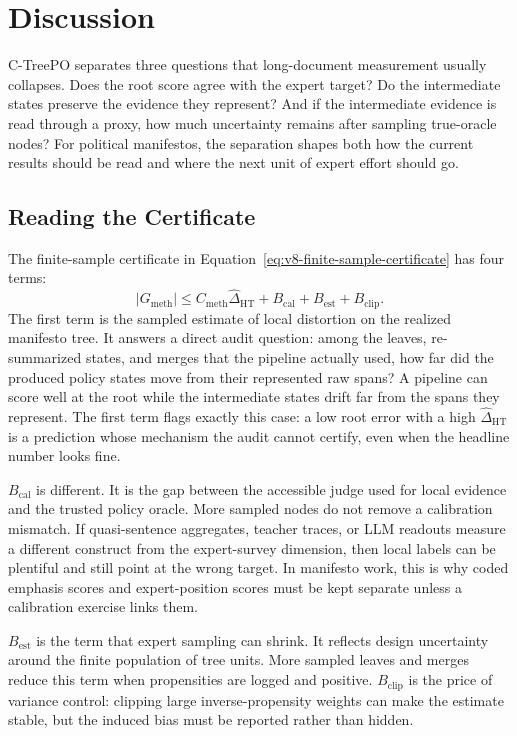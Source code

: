 \section{Discussion}\label{sec:v8-discussion}

C-TreePO separates three questions that long-document measurement
usually collapses. Does the root score agree with the expert target?
Do the intermediate states preserve the evidence they represent? And
if the intermediate evidence is read through a proxy, how much
uncertainty remains after sampling true-oracle nodes? For political
manifestos, the separation shapes both how the current results
should be read and where the next unit of expert effort should go.

\subsection{Reading the Certificate}

The finite-sample certificate in
Equation~\eqref{eq:v8-finite-sample-certificate} has four terms:
\[
  |G_{\mathrm{meth}}|
  \le
  C_{\mathrm{meth}}\widehat{\Delta}_{\mathrm{HT}}
  +
  B_{\mathrm{cal}}
  +
  B_{\mathrm{est}}
  +
  B_{\mathrm{clip}} .
\]
The first term is the sampled estimate of local distortion on the
realized manifesto tree. It answers a direct audit question: among
the leaves, re-summarized states, and merges that the pipeline
actually used, how far did the produced policy states move from
their represented raw spans? A pipeline can score well at the root
while the intermediate states drift far from the spans they
represent. The first term flags exactly this case: a low root error
with a high \(\widehat{\Delta}_{\mathrm{HT}}\) is a prediction whose
mechanism the audit cannot certify, even when the headline number
looks fine.

\(B_{\mathrm{cal}}\) is different. It is the gap between the accessible judge
used for local evidence and the trusted policy oracle. More sampled nodes do
not remove a calibration mismatch. If quasi-sentence aggregates, teacher
traces, or LLM readouts measure a different construct from the expert-survey
dimension, then local labels can be plentiful and still point at the wrong
target. In manifesto work, this is why coded emphasis scores and
expert-position scores must be kept separate unless a calibration exercise
links them.

\(B_{\mathrm{est}}\) is the term that expert sampling can shrink. It reflects
design uncertainty around the finite population of tree units. More sampled
leaves and merges reduce this term when propensities are logged and positive.
\(B_{\mathrm{clip}}\) is the price of variance control: clipping large
inverse-propensity weights can make the estimate stable, but the induced bias
must be reported rather than hidden.

